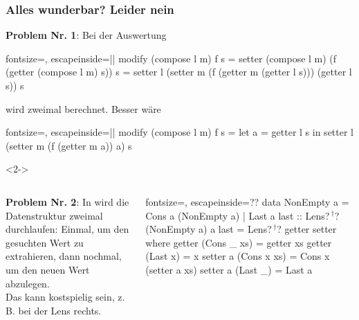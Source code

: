 \documentclass{beamer}
\newcommand{\kreuz}{$\,^\dag$} %
\begin{document}
\begin{frame}[fragile]
  \frametitle{
    Alles wunderbar? Leider nein
  }

  \textbf{Problem Nr. 1}: Bei der Auswertung
\begin{haskellcode*}{fontsize=\small, escapeinside=||}
  modify (compose l m) f s
= setter (compose l m) (f (getter (compose l m) s)) s
= setter l (setter m (f (getter m (getter l s))) (getter l s)) s
\end{haskellcode*}
  wird  zweimal berechnet.
  Besser wäre
\begin{haskellcode*}{fontsize=\small, escapeinside=||}
  modify (compose l m) f s
= let a = getter l s in setter l (setter m (f (getter m a)) a) s
\end{haskellcode*}

  \begin{visibleenv}<2->
    \begin{columns}[t]

      \textbf{Problem Nr. 2}: In  wird die Datenstruktur zweimal durchlaufen: Einmal, um den gesuchten Wert zu extrahieren, dann nochmal, um den neuen Wert abzulegen. \\
      Das kann kostspielig sein, z.\,B. bei der Lens rechts.
\begin{haskellcode*}{fontsize=\footnotesize, escapeinside=??}
data NonEmpty a =
  Cons a (NonEmpty a) | Last a
last :: Lens?\kreuz? (NonEmpty a) a
last = Lens?\kreuz? getter setter
 where
  getter (Cons _ xs) = getter xs
  getter (Last x) = x
  setter a (Cons x xs) =
    Cons x (setter a xs)
  setter a (Last _) = Last a
\end{haskellcode*}
    \end{columns}
  \end{visibleenv}
\end{frame}
\end{document}
